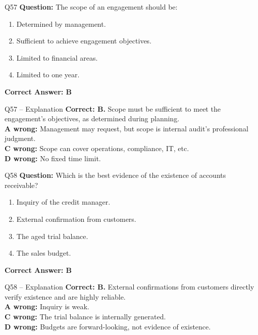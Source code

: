 \documentclass[aspectratio=169,10pt]{beamer}
\begin{document}
	\begin{frame}[t]{Q57}
		\small
		\textbf{Question:} The scope of an engagement should be:
		\begin{enumerate}[label=\Alph*.,itemsep=1pt,topsep=2pt]
			\item Determined by management.
			\item Sufficient to achieve engagement objectives.
			\item Limited to financial areas.
			\item Limited to one year.
		\end{enumerate}
		\vspace{4pt}
		\textbf{Correct Answer: B}
	\end{frame}
	
	\begin{frame}[t]{Q57 -- Explanation}
		\small
		\textbf{Correct: B.} Scope must be sufficient to meet the engagement's objectives, as determined during planning. \\[4pt]
		\textbf{A wrong:} Management may request, but scope is internal audit's professional judgment. \\[2pt]
		\textbf{C wrong:} Scope can cover operations, compliance, IT, etc. \\[2pt]
		\textbf{D wrong:} No fixed time limit.
	\end{frame}
	
	\begin{frame}[t]{Q58}
		\small
		\textbf{Question:} Which is the best evidence of the existence of accounts receivable?
		\begin{enumerate}[label=\Alph*.,itemsep=1pt,topsep=2pt]
			\item Inquiry of the credit manager.
			\item External confirmation from customers.
			\item The aged trial balance.
			\item The sales budget.
		\end{enumerate}
		\vspace{4pt}
		\textbf{Correct Answer: B}
	\end{frame}
	
	\begin{frame}[t]{Q58 -- Explanation}
		\small
		\textbf{Correct: B.} External confirmations from customers directly verify existence and are highly reliable. \\[4pt]
		\textbf{A wrong:} Inquiry is weak. \\[2pt]
		\textbf{C wrong:} The trial balance is internally generated. \\[2pt]
		\textbf{D wrong:} Budgets are forward-looking, not evidence of existence.
	\end{frame}
	
\end{document}
